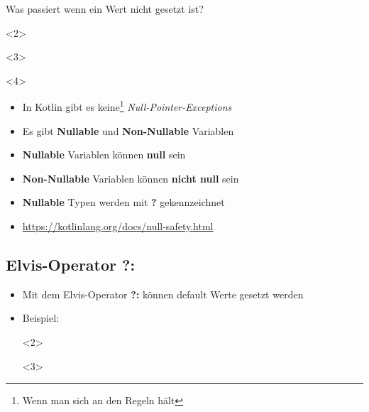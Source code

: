     \begin{frame}
        \slidehead
        \large
        Was passiert wenn ein Wert nicht gesetzt ist?
        \pause
        \begin{onlyenv}<2>
        \end{onlyenv}
        \begin{onlyenv}<3>
        \end{onlyenv}
        \begin{onlyenv}<4>
        \end{onlyenv}
    \end{frame}

    \livecoding

    \begin{frame}
        \slidehead
        \begin{itemize}
            [<+->]
            \item In Kotlin gibt es keine\footnote{Wenn man sich an den Regeln hält} \textit{Null-Pointer-Exceptions}
            \item Es gibt \textbf{Nullable} und \textbf{Non-Nullable} Variablen
            \item \textbf{Nullable} Variablen können \textbf{null} sein
            \item \textbf{Non-Nullable} Variablen können \textbf{nicht null} sein
            \item \textbf{Nullable} Typen werden mit \textbf{?} gekennzeichnet
            \item \url{https://kotlinlang.org/docs/null-safety.html}
        \end{itemize}
    \end{frame}

    \subsection{Elvis-Operator ?:}\label{subsec:elvis-operator}
    \begin{frame}
        \slidehead
        \vspace{-1.5em}
        \begin{itemize}
            \item<1-> Mit dem Elvis-Operator \textbf{?:} können default Werte gesetzt werden
            \item<2-> Beispiel:
            \begin{onlyenv}<2>
            \end{onlyenv}
            \begin{onlyenv}<3>
            \end{onlyenv}
        \end{itemize}
    \end{frame}

